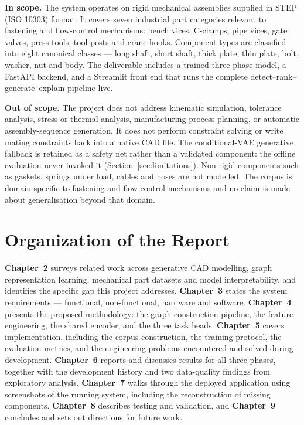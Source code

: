 \documentclass[12pt,oneside,a4paper]{report}
\begin{document}
\textbf{In scope.} The system operates on rigid mechanical assemblies
supplied in STEP (ISO 10303) format. It covers seven industrial part
categories relevant to fastening and flow-control mechanisms: bench vices,
C-clamps, pipe vices, gate valves, press tools, tool posts and crane hooks.
Component types are classified into eight canonical classes --- long shaft,
short shaft, thick plate, thin plate, bolt, washer, nut and body. The
deliverable includes a trained three-phase model, a FastAPI backend, and a
Streamlit front end that runs the complete detect--rank--generate--explain
pipeline live.

\textbf{Out of scope.} The project does not address kinematic simulation,
tolerance analysis, stress or thermal analysis, manufacturing process
planning, or automatic assembly-sequence generation. It does not perform
constraint solving or write mating constraints back into a native CAD file.
The conditional-VAE generative fallback is retained as a safety net rather
than a validated component: the offline evaluation never invoked it
(Section~\ref{sec:limitations}).
Non-rigid components such as gaskets, springs under load, cables and hoses
are not modelled. The corpus is domain-specific to fastening and
flow-control mechanisms and no claim is made about generalisation beyond
that domain.

\section{Organization of the Report}

\textbf{Chapter~2} surveys related work across generative CAD modelling,
graph representation learning, mechanical part datasets and model
interpretability, and identifies the specific gap this project addresses.
\textbf{Chapter~3} states the system requirements --- functional,
non-functional, hardware and software. \textbf{Chapter~4} presents the
proposed methodology: the graph construction pipeline, the feature
engineering, the shared encoder, and the three task heads.
\textbf{Chapter~5} covers implementation, including the corpus construction,
the training protocol, the evaluation metrics, and the engineering problems
encountered and solved during development. \textbf{Chapter~6} reports and
discusses results for all three phases, together with the development history
and two data-quality findings from exploratory analysis. \textbf{Chapter~7}
walks through the deployed application using screenshots of the running
system, including the reconstruction of missing components.
\textbf{Chapter~8} describes testing and validation, and \textbf{Chapter~9}
concludes and sets out directions for future work.
\end{document}
